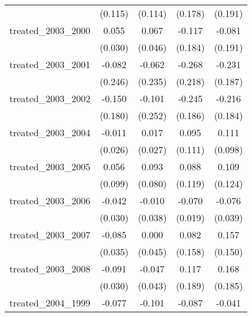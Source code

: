 {\begin{tabular}{l*{4}{c}}
            &     (0.115)         &     (0.114)         &     (0.178)         &     (0.191)         \\
[1em]
treated\_2003\_2000&       0.055         &       0.067         &      -0.117         &      -0.081         \\
            &     (0.030)         &     (0.046)         &     (0.184)         &     (0.191)         \\
[1em]
treated\_2003\_2001&      -0.082         &      -0.062         &      -0.268         &      -0.231         \\
            &     (0.246)         &     (0.235)         &     (0.218)         &     (0.187)         \\
[1em]
treated\_2003\_2002&      -0.150         &      -0.101         &      -0.245         &      -0.216         \\
            &     (0.180)         &     (0.252)         &     (0.186)         &     (0.184)         \\
[1em]
treated\_2003\_2004&      -0.011         &       0.017         &       0.095         &       0.111         \\
            &     (0.026)         &     (0.027)         &     (0.111)         &     (0.098)         \\
[1em]
treated\_2003\_2005&       0.056         &       0.093         &       0.088         &       0.109         \\
            &     (0.099)         &     (0.080)         &     (0.119)         &     (0.124)         \\
[1em]
treated\_2003\_2006&      -0.042         &      -0.010         &      -0.070\sym{***}&      -0.076         \\
            &     (0.030)         &     (0.038)         &     (0.019)         &     (0.039)         \\
[1em]
treated\_2003\_2007&      -0.085\sym{*}  &       0.000         &       0.082         &       0.157         \\
            &     (0.035)         &     (0.045)         &     (0.158)         &     (0.150)         \\
[1em]
treated\_2003\_2008&      -0.091\sym{**} &      -0.047         &       0.117         &       0.168         \\
            &     (0.030)         &     (0.043)         &     (0.189)         &     (0.185)         \\
[1em]
treated\_2004\_1999&      -0.077         &      -0.101         &      -0.087         &      -0.041         \\

\end{tabular}}
